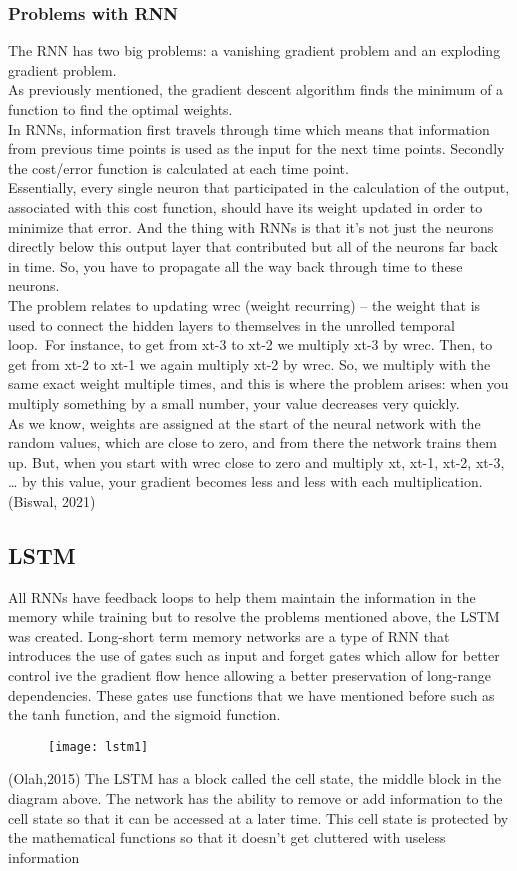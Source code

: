 \documentclass{article}
\begin{document}
\subsubsection{Problems with RNN}
The RNN has two big problems: a vanishing gradient problem and an exploding gradient
problem.\\
As previously mentioned, the gradient descent algorithm finds the minimum of a function to
find the optimal weights.\\
In RNNs, information first travels through time which means that information from previous
time points is used as the input for the next time points. Secondly the cost/error function is
calculated at each time point.\\
Essentially, every single neuron that participated in the calculation of the output, associated with
this cost function, should have its weight updated in order to minimize that error. And the thing
with RNNs is that it’s not just the neurons directly below this output layer that contributed but
all of the neurons far back in time. So, you have to propagate all the way back through time to
these neurons.\\
The problem relates to updating wrec (weight recurring) – the weight that is used to connect the
hidden layers to themselves in the unrolled temporal loop.\
For instance, to get from xt-3 to xt-2 we multiply xt-3 by wrec. Then, to get from xt-2 to xt-1 we
again multiply xt-2 by wrec. So, we multiply with the same exact weight multiple times, and this
is where the problem arises: when you multiply something by a small number, your value
decreases very quickly.\\
As we know, weights are assigned at the start of the neural network with the random values,
which are close to zero, and from there the network trains them up. But, when you start with
wrec close to zero and multiply xt, xt-1, xt-2, xt-3, … by this value, your gradient becomes less
and less with each multiplication.\\
(Biswal, 2021)

\subsection{LSTM}
All RNNs have feedback loops to help them maintain the information in the memory while
training but to resolve the problems mentioned above, the LSTM was created.
Long-short term memory networks are a type of RNN that introduces the use of gates such as
input and forget gates which allow for better control ive the gradient flow hence allowing a
better preservation of long-range dependencies. These gates use functions that we have
mentioned before such as the tanh function, and the sigmoid function.
\begin{figure}[h!]
    \centering
    \texttt{[image: lstm1]}
    \caption{}
\end{figure}
(Olah,2015)
The LSTM has a block called the cell state, the middle block in the diagram above. The network
has the ability to remove or add information to the cell state so that it can be accessed at a later
time. This cell state is protected by the mathematical functions so that it doesn’t get cluttered
with useless information
\end{document}
